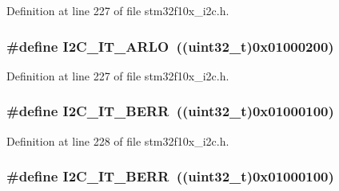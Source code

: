 Definition at line 227 of file stm32f10x\+\_\+i2c.\+h.

\subsubsection[{\texorpdfstring{I2\+C\+\_\+\+I\+T\+\_\+\+A\+R\+LO}{I2C_IT_ARLO}}]{\setlength{\rightskip}{0pt plus 5cm}\#define I2\+C\+\_\+\+I\+T\+\_\+\+A\+R\+LO~(({\bf uint32\+\_\+t})0x01000200)}\hypertarget{group___i2_c__interrupts__definition_ga2439154bee2a45a4147921cec18177d1}{}\label{group___i2_c__interrupts__definition_ga2439154bee2a45a4147921cec18177d1}


Definition at line 227 of file stm32f10x\+\_\+i2c.\+h.

\subsubsection[{\texorpdfstring{I2\+C\+\_\+\+I\+T\+\_\+\+B\+E\+RR}{I2C_IT_BERR}}]{\setlength{\rightskip}{0pt plus 5cm}\#define I2\+C\+\_\+\+I\+T\+\_\+\+B\+E\+RR~(({\bf uint32\+\_\+t})0x01000100)}\hypertarget{group___i2_c__interrupts__definition_gad9aec016c98df6dbb95a5c10b180c202}{}\label{group___i2_c__interrupts__definition_gad9aec016c98df6dbb95a5c10b180c202}


Definition at line 228 of file stm32f10x\+\_\+i2c.\+h.

\subsubsection[{\texorpdfstring{I2\+C\+\_\+\+I\+T\+\_\+\+B\+E\+RR}{I2C_IT_BERR}}]{\setlength{\rightskip}{0pt plus 5cm}\#define I2\+C\+\_\+\+I\+T\+\_\+\+B\+E\+RR~(({\bf uint32\+\_\+t})0x01000100)}\hypertarget{group___i2_c__interrupts__definition_gad9aec016c98df6dbb95a5c10b180c202}{}\label{group___i2_c__interrupts__definition_gad9aec016c98df6dbb95a5c10b180c202}


